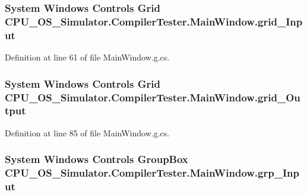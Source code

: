 \subsubsection[{grid\+\_\+\+Input}]{\setlength{\rightskip}{0pt plus 5cm}System Windows Controls Grid C\+P\+U\+\_\+\+O\+S\+\_\+\+Simulator.\+Compiler\+Tester.\+Main\+Window.\+grid\+\_\+\+Input\hspace{0.3cm}{\ttfamily [package]}}\label{class_c_p_u___o_s___simulator_1_1_compiler_tester_1_1_main_window_a69da11a837f2a6812b815fed3d443a3e}


Definition at line 61 of file Main\+Window.\+g.\+cs.

\hypertarget{class_c_p_u___o_s___simulator_1_1_compiler_tester_1_1_main_window_a142fa92ed0a755688a31bfcbd3456e59}{}
\subsubsection[{grid\+\_\+\+Output}]{\setlength{\rightskip}{0pt plus 5cm}System Windows Controls Grid C\+P\+U\+\_\+\+O\+S\+\_\+\+Simulator.\+Compiler\+Tester.\+Main\+Window.\+grid\+\_\+\+Output\hspace{0.3cm}{\ttfamily [package]}}\label{class_c_p_u___o_s___simulator_1_1_compiler_tester_1_1_main_window_a142fa92ed0a755688a31bfcbd3456e59}


Definition at line 85 of file Main\+Window.\+g.\+cs.

\hypertarget{class_c_p_u___o_s___simulator_1_1_compiler_tester_1_1_main_window_a057e72ce888214ee30da5048c8bdae77}{}
\subsubsection[{grp\+\_\+\+Input}]{\setlength{\rightskip}{0pt plus 5cm}System Windows Controls Group\+Box C\+P\+U\+\_\+\+O\+S\+\_\+\+Simulator.\+Compiler\+Tester.\+Main\+Window.\+grp\+\_\+\+Input\hspace{0.3cm}{\ttfamily [package]}}\label{class_c_p_u___o_s___simulator_1_1_compiler_tester_1_1_main_window_a057e72ce888214ee30da5048c8bdae77}


